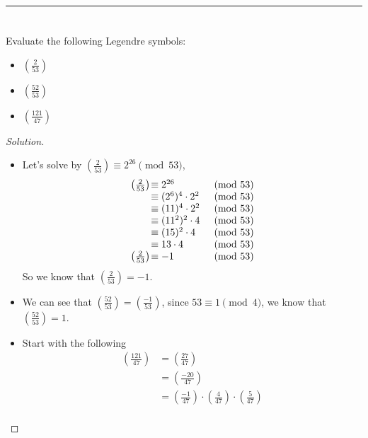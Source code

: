 \documentclass[11pt]{article}
\newcommand\leg[2]{\left(\frac{#1}{#2}\right)}
\newenvironment{myproblem}[1][Problem]{\begin{trivlist}
    \item[\hskip \labelsep {\bfseries #1.}]}{\end{trivlist}}
\newenvironment{solution}
  {\renewcommand\qedsymbol{$~$}\begin{proof}[Solution]$ $\par\nobreak\ignorespaces}
  {\end{proof}}
\begin{document}
\hrule

\section{}
\begin{myproblem}
  Evaluate the following Legendre symbols:
  \begin{itemize}
    \item [(a)] $\leg{2}{53}$
    \item [(b)] $\leg{52}{53}$
    \item [(c)] $\leg{121}{47}$
  \end{itemize}
\end{myproblem}

\begin{solution}
  \begin{itemize}
    \item [(a)] Let's solve by $\leg{2}{53}\equiv 2^{26} \pmod{53}$,
          \[\begin{array}{r @{\hspace{1pt}} l l}
              \leg{2}{53} & \equiv  2^{26}             & \pmod{53} \\
                          & \equiv (2^6)^{4} \cdot 2^2 & \pmod{53} \\
                          & \equiv (11)^{4} \cdot 2^2  & \pmod{53} \\
                          & \equiv (11^2)^{2} \cdot 4  & \pmod{53} \\
                          & \equiv (15)^{2} \cdot 4    & \pmod{53} \\
                          & \equiv 13 \cdot 4          & \pmod{53} \\
              \leg{2}{53} & \equiv -1                  & \pmod{53} \\
            \end{array}\]
          So we know that $\leg{2}{53}= -1$.
    \item [(b)] We can see that $\leg{52}{53} = \leg{-1}{53}$, since $53 \equiv 1 \pmod{4}$, we know that $\leg{52}{53}=1$.
    \item [(c)] Start with the following
          \begin{align*}
            \leg{121}{47} & = \leg{27}{47}                                     \\
                          & = \leg{-20}{47}                                    \\
                          & = \leg{-1}{47} \cdot \leg{4}{47} \cdot \leg{5}{47} \\

\end{align*}
\end{itemize}
\end{solution}
\end{document}
